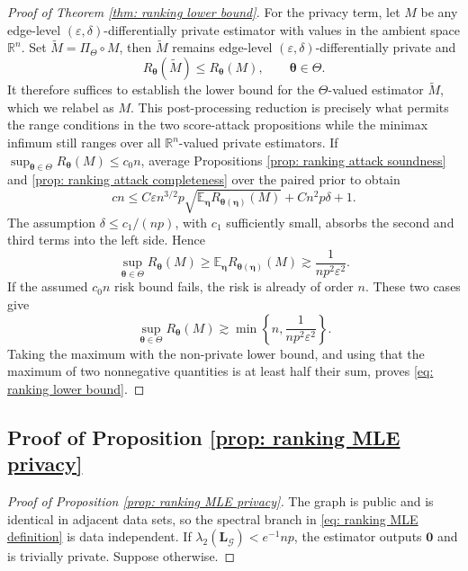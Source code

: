 \documentclass[letterpaper,12pt]{article}
\numberwithin{equation}{section}
\theoremstyle{plain}
\numberwithin{Theorem}{section}
\numberwithin{proposition}{section}
\numberwithin{Lemma}{section}
{
	\theoremstyle{definition}
	\newtheorem{Definition}{Definition}
	\newtheorem{example}{Example}
	\numberwithin{example}{section}
	\newtheorem{fact}{Fact}
	\numberwithin{fact}{section}
	\newtheorem{remark}{Remark}
}
\newcommand{\furtherrev}[1]{#1}
\newcommand{\1}{\mathbbm{1}}
\def\bth{{\boldsymbol{\theta}}}
\def\E{\mathbb{E}}
\begin{document}
{\begin{proof}[Proof of Theorem \ref{thm: ranking lower bound}]
For the privacy term, let $M$ be any edge-level $(\varepsilon,\delta)$-differentially private estimator \furtherrev{with values in the ambient space $\mathbb R^n$}. Set
$\widetilde M=\Pi_\Theta\circ M$, then $\widetilde M$ remains edge-level $(\varepsilon,\delta)$-differentially private and
\[
R_\bth(\widetilde M)\leq R_\bth(M),\qquad \bth\in\Theta.
\]
It therefore suffices to establish the lower bound for the $\Theta$-valued estimator $\widetilde M$, which we relabel as $M$. \furtherrev{This post-processing reduction is precisely what permits the range conditions in the two score-attack propositions while the minimax infimum still ranges over all $\mathbb R^n$-valued private estimators.} If
$\sup_{\bth\in\Theta}R_\bth(M)\leq c_0n$, average Propositions \ref{prop: ranking attack soundness} and \ref{prop: ranking attack completeness} over the paired prior to obtain
\[
cn\leq C\varepsilon n^{3/2}p
\sqrt{\E_{\bm\eta}R_{\bth(\bm\eta)}(M)}+Cn^2p\delta+1.
\]
The assumption $\delta\leq c_1/(np)$, with $c_1$ sufficiently small, absorbs the second and third terms into the left side. Hence
\[
\sup_{\bth\in\Theta}R_\bth(M)
\geq\E_{\bm\eta}R_{\bth(\bm\eta)}(M)
\gtrsim\frac{1}{np^2\varepsilon^2}.
\]
If the assumed $c_0n$ risk bound fails, the risk is already of order $n$. These two cases give
\[
\sup_{\bth\in\Theta}R_\bth(M)
\gtrsim\min\left\{n,\frac{1}{np^2\varepsilon^2}\right\}.
\]
Taking the maximum with the non-private lower bound, and using that the maximum of two nonnegative quantities is at least half their sum, proves \eqref{eq: ranking lower bound}.
\end{proof}

\subsection{Proof of Proposition \ref{prop: ranking MLE privacy}}\label{sec: proof of prop: ranking MLE privacy}
\begin{proof}[Proof of Proposition \ref{prop: ranking MLE privacy}]
The graph is public and is identical in adjacent data sets, so the spectral branch in \eqref{eq: ranking MLE definition} is data independent. If
$\lambda_2(\bm L_{\mathcal G})<e^{-1}np$, the estimator outputs $\bm0$ and is trivially private. Suppose otherwise.


\end{proof}}
\end{document}
